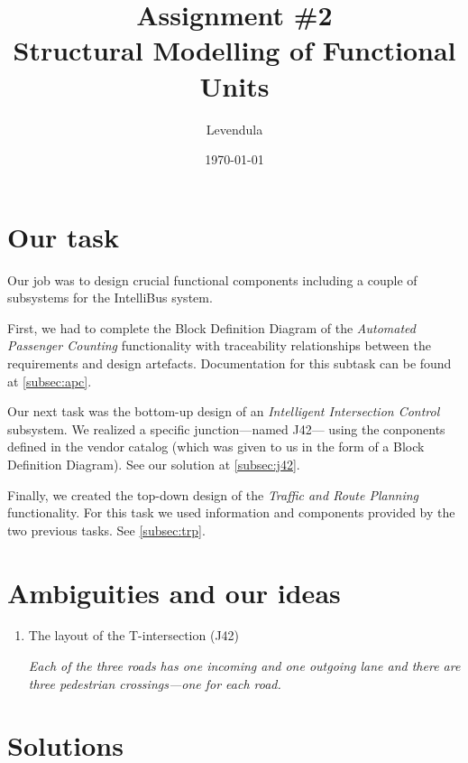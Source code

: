 \documentclass[a4paper]{article}
\title{Assignment \#2 \\ Structural Modelling of Functional Units}
\author{Levendula}
\date{\today}
\begin{document}


\tableofcontents
\listoffigures
\clearpage

\section{Our task}

Our job was to design crucial functional components including a couple of
subsystems for the IntelliBus system.

First, we had to complete the Block Definition Diagram of the \emph{Automated
Passenger Counting} functionality with traceability relationships between the
requirements and design artefacts. Documentation for this subtask can be found
at \cref{subsec:apc}.

Our next task was the bottom-up design of an \emph{Intelligent Intersection
Control} subsystem. We realized a specific junction—named J42— using the
conponents defined in the vendor catalog (which was given to us in the form of a
Block Definition Diagram). See our solution at \cref{subsec:j42}.

Finally, we created the top-down design of the \emph{Traffic and Route Planning}
functionality. For this task we used information and components provided by the
two previous tasks. See \cref{subsec:trp}.




\section{Ambiguities and our ideas}

\begin{enumerate}
	\item The layout of the T-intersection (J42)

		\textit{Each of the three roads has one incoming and one
			outgoing lane and there are three pedestrian
			crossings—one for each road.}
\end{enumerate}



\section{Solutions}
\end{document}
